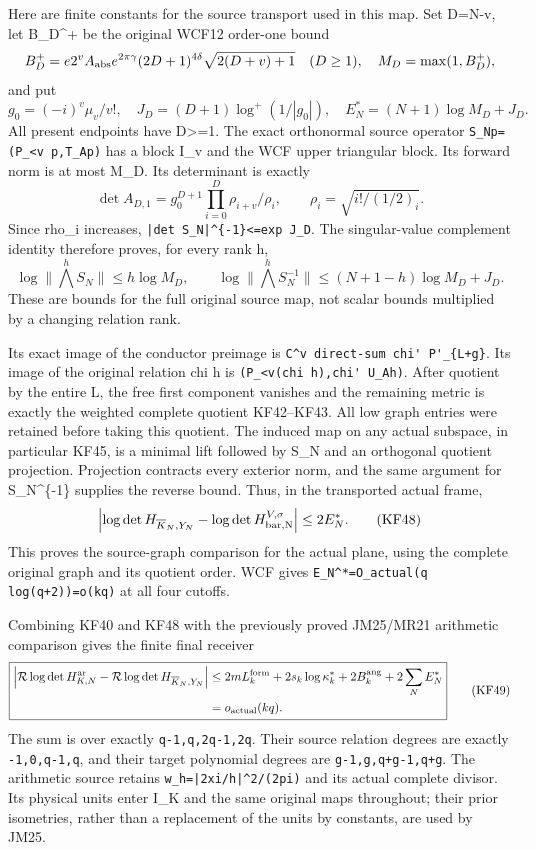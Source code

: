 Here are finite constants for the source transport used in this map. Set D=N-v, let B\_D\^{}+ be the original WCF12 order-one bound \[
B_D^+=e2^v A_{\rm abs}e^{2\pi\gamma}(2D+1)^{4\delta}
\sqrt{2(D+v)+1}\quad(D\ge1),\quad M_D=\max(1,B_D^+),
\] and put \[
g_0=(-i)^v\mu_v/v!,\quad J_D=(D+1)\log^+(1/|g_0|),\quad
E_N^*= (N+1)\log M_D+J_D.
\tag{KF46}
\] All present endpoints have D\textgreater=1. The exact orthonormal source operator \nolinkurl{S_Np=(P_<v p,T_Ap)} has a block I\_v and the WCF upper triangular block. Its forward norm is at most M\_D. Its determinant is exactly \[
\det A_{D,1}=g_0^{D+1}\prod_{i=0}^D\rho_{i+v}/\rho_i,
\qquad \rho_i=\sqrt{i!/(1/2)_i}.
\] Since rho\_i increases, \nolinkurl{|det S_N|^{-1}<=exp J_D}. The singular-value complement identity therefore proves, for every rank h, \[
\log\|\bigwedge^h S_N\|\le h\log M_D,\qquad
\log\|\bigwedge^hS_N^{-1}\|\le(N+1-h)\log M_D+J_D.
\tag{KF47}
\] These are bounds for the full original source map, not scalar bounds multiplied by a changing relation rank.

Its exact image of the conductor preimage is \nolinkurl{C^v direct-sum chi' P'_{L+g}}. Its image of the original relation chi h is \nolinkurl{(P_<v(chi h),chi' U_Ah)}. After quotient by the entire L, the free first component vanishes and the remaining metric is exactly the weighted complete quotient KF42--KF43. All low graph entries were retained before taking this quotient. The induced map on any actual subspace, in particular KF45, is a minimal lift followed by S\_N and an orthogonal quotient projection. Projection contracts every exterior norm, and the same argument for S\_N\^{}\{-1\} supplies the reverse bound. Thus, in the transported actual frame, \[
\left|\log\det H_{\overline K_N,Y_N}
-\log\det H_{\rm bar,N}^{V,\sigma}\right|\le2E_N^*.
\tag{KF48}
\] This proves the source-graph comparison for the actual plane, using the complete original graph and its quotient order. WCF gives \nolinkurl{E_N^*=O_actual(q log(q+2))=o(kq)} at all four cutoffs.

Combining KF40 and KF48 with the previously proved JM25/MR21 arithmetic comparison gives the finite final receiver \[
\boxed{\begin{aligned}
\left|\mathcal R\log\det H_{K,N}^{\rm ar}
-\mathcal R\log\det H_{\overline K_N,Y_N}\right|
\le{}&2mL_k^{\rm form}+2s_k\log\kappa_k^*
+2B_k^{\rm ang}+2\sum_N E_N^*\\
={}&o_{\rm actual}(kq).
\end{aligned}}
\tag{KF49}
\] The sum is over exactly \texttt{q-1,q,2q-1,2q}. Their source relation degrees are exactly \texttt{-1,0,q-1,q}, and their target polynomial degrees are \texttt{g-1,g,q+g-1,q+g}. The arithmetic source retains \nolinkurl{w_h=|2xi/h|^2/(2pi)} and its actual complete divisor. Its physical units enter I\_K and the same original maps throughout; their prior isometries, rather than a replacement of the units by constants, are used by JM25.

